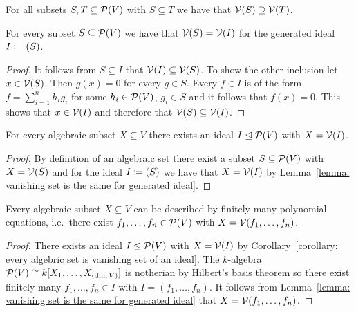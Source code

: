 


\begin{lemma}
  \label{lemma: V antimonotone}
  For all subsets $S, T \subseteq \mathcal{P}(V)$ with $S \subseteq T$ we have that $\mathcal{V}(S) \supseteq \mathcal{V}(T)$.
\end{lemma}


\begin{lemma}
  \label{lemma: vanishing set is the same for generated ideal}
  For every subset $S \subseteq \mathcal{P}(V)$ we have that $\mathcal{V}(S) = \mathcal{V}(I)$ for the generated ideal $I \coloneqq (S)$.
\end{lemma}


\begin{proof}
  It follows from $S \subseteq I$ that $\mathcal{V}(I) \subseteq \mathcal{V}(S)$.
  To show the other inclusion let $x \in \mathcal{V}(S)$.
  Then $g(x) = 0$ for every $g \in S$.
  Every $f \in I$ is of the form $f = \sum_{i=1}^n h_i g_i$ for some $h_i \in \mathcal{P}(V)$, $g_i \in S$ and it follows that $f(x) = 0$.
  This shows that $x \in \mathcal{V}(I)$ and therefore that $\mathcal{V}(S) \subseteq \mathcal{V}(I)$.
\end{proof}


\begin{corollary}
  \label{corollary: every algebric set is vanishing set of an ideal}
  For every algebraic subset $X \subseteq V$ there exists an ideal $I \trianglelefteq \mathcal{P}(V)$ with $X = \mathcal{V}(I)$.
\end{corollary}


\begin{proof}
  By definition of an algebraic set there exist a subset $S \subseteq \mathcal{P}(V)$ with $X = \mathcal{V}(S)$ and for the ideal $I \coloneqq (S)$ we have that $X = \mathcal{V}(I)$ by Lemma~\ref{lemma: vanishing set is the same for generated ideal}.
\end{proof}


\begin{corollary}
  Every algebraic subset $X \subseteq V$ can be described by finitely many polynomial equations, i.e.\ there exist $f_1, \dotsc, f_n \in \mathcal{P}(V)$ with $X = \mathcal{V}(f_1, \dotsc, f_n)$.
\end{corollary}


\begin{proof}
  There exists an ideal $I \trianglelefteq \mathcal{P}(V)$ with $X = \mathcal{V}(I)$ by Corollary~\ref{corollary: every algebric set is vanishing set of an ideal}.
  The $k$-algebra $\mathcal{P}(V) \cong k[X_1, \dotsc, X_{(\dim V)}]$ is notherian by \hyperref[theorem: Hilberts basis theorem]{Hilbert’s basis theorem} so there exist finitely many $f_1, \dotsc, f_n \in I$ with $I = (f_1, \dotsc, f_n)$.
  It follows from Lemma~\ref{lemma: vanishing set is the same for generated ideal} that $X = \mathcal{V}(f_1, \dotsc, f_n)$.
\end{proof}




